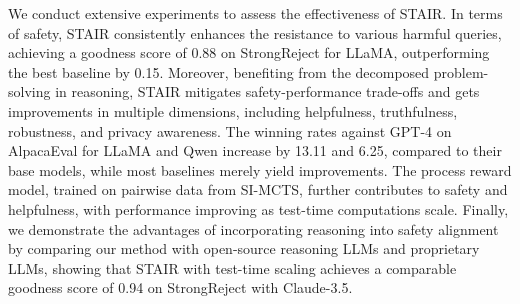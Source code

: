 We conduct extensive experiments to assess the effectiveness of STAIR. In terms of safety, STAIR consistently enhances the resistance to various harmful queries, achieving a goodness score of 0.88 on StrongReject for LLaMA, outperforming the best baseline by 0.15. Moreover, benefiting from the decomposed problem-solving in reasoning, STAIR mitigates safety-performance trade-offs and gets improvements in multiple dimensions, including helpfulness, truthfulness, robustness, and privacy awareness. The winning rates against GPT-4 on AlpacaEval for LLaMA and Qwen increase by 13.11 and 6.25, compared to their base models, while most baselines merely yield improvements. The process reward model, trained on pairwise data from SI-MCTS, further contributes to safety and helpfulness, with performance improving as test-time computations scale. Finally, we demonstrate the advantages of incorporating reasoning into safety alignment by comparing our method with open-source reasoning LLMs and proprietary LLMs, showing that STAIR with test-time scaling achieves a comparable goodness score of 0.94 on StrongReject with Claude-3.5.


